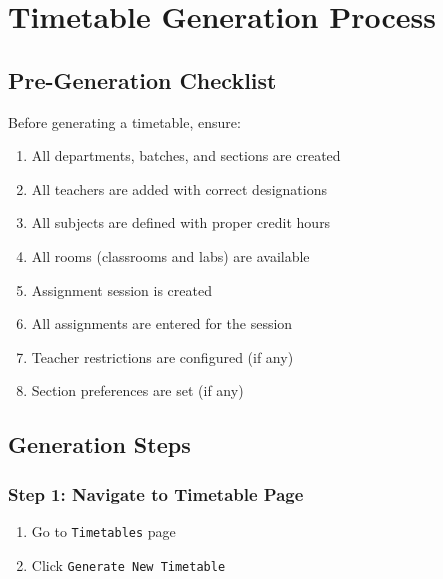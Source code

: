 \documentclass[12pt,a4paper]{article}
\begin{document}
\section{Timetable Generation Process}

\subsection{Pre-Generation Checklist}

Before generating a timetable, ensure:
\begin{enumerate}
    \item All departments, batches, and sections are created
    \item All teachers are added with correct designations
    \item All subjects are defined with proper credit hours
    \item All rooms (classrooms and labs) are available
    \item Assignment session is created
    \item All assignments are entered for the session
    \item Teacher restrictions are configured (if any)
    \item Section preferences are set (if any)
\end{enumerate}

\subsection{Generation Steps}

\subsubsection{Step 1: Navigate to Timetable Page}
\begin{enumerate}
    \item Go to \texttt{Timetables} page
    \item Click \texttt{Generate New Timetable}
\end{enumerate}
\end{document}
